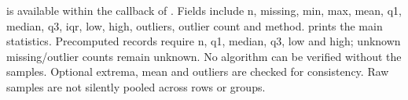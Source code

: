 \key{\gradstat} is available within the callback of \key{\gradcomputesummary}.
Fields include n, missing, min, max, mean, q1, median, q3, iqr, low, high,
outliers, outlier count and method. \key{\gradsummarytext} prints the main
statistics. Precomputed records require n, q1, median, q3, low and high;
unknown missing/outlier counts remain unknown. No algorithm can be verified
without the samples. Optional extrema, mean and outliers are checked for
consistency. Raw samples are not silently pooled across rows or groups.
